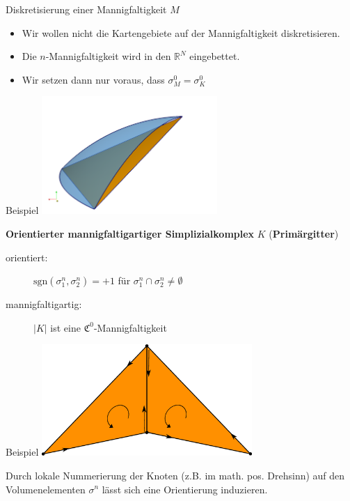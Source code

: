 \documentclass{beamer}
\newcommand{\R}{\mathds{R}}
\newcommand{\sgn}{\text{sgn}}
\begin{document}
  \begin{frame}
    \begin{block}{Diskretisierung einer Mannigfaltigkeit \( M \)}
      \begin{itemize}
        \item Wir wollen nicht die Kartengebiete auf der Mannigfaltigkeit diskretisieren.
        \item Die \( n \)-Mannigfaltigkeit wird in den \( \R^{N} \) eingebettet.
        \item Wir setzen dann nur voraus, dass \( \sigma^{0}_{M} = \sigma^{0}_{K} \)
      \end{itemize}
    \end{block}
    \begin{block}{Beispiel}
      \centering\includegraphics[width=0.5\textwidth]{bilder/paraview/abstractSimplex.png}
    \end{block}
  \end{frame}

  \begin{frame}
    \begin{block}{\textbf{Orientierter mannigfaltigartiger Simplizialkomplex} \( K \) (\textbf{Primärgitter})}
      \begin{description}
        \item[orientiert:] \( \sgn(\sigma^{n}_{1}, \sigma^{n}_{2}) = +1 \) für \( \sigma^{n}_{1} \cap \sigma^{n}_{2} \ne \emptyset \)
        \item[mannigfaltigartig:] \( |K| \) ist eine \( \mathfrak{C}^{0} \)-Mannigfaltigkeit
      \end{description}
    \end{block}
    \begin{block}{Beispiel}
      \centering\includegraphics[width=0.6\textwidth]{bilder/inkscape/2Dreiecke.eps}
    \end{block}
    Durch lokale Nummerierung der Knoten (z.B. im math. pos. Drehsinn) auf den Volumenelementen \( \sigma^{n} \) lässt sich eine Orientierung induzieren.
  \end{frame}
\end{document}
